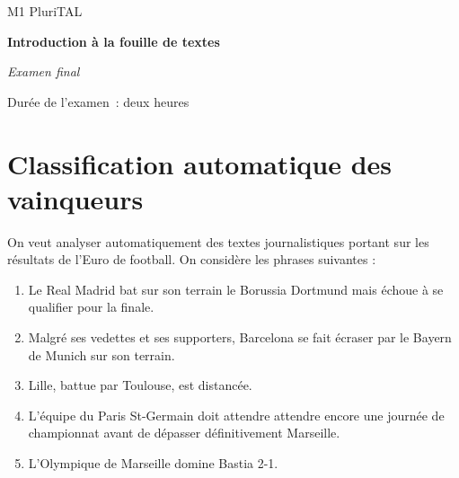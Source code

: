 \documentclass[a4paper, 11pt]{article}
\title{\titlepagetitle}
\author{\myname <\mymail>}
\date{\docdate}
\begin{document}
{
   \begin{center}
      \large{M1 PluriTAL}\par
      \vspace{1em}
      \huge\textbf{Introduction à la fouille de textes}\par
      \vspace{0.5em}
      \LARGE\textit{Examen final}\par
      \vspace{0.5em}
      \Large\thedate
   \end{center}
}

Durée de l'examen : deux heures


\section{Classification automatique des vainqueurs}
On veut analyser automatiquement des textes journalistiques portant
sur les résultats de l'Euro de football. On considère les phrases suivantes :

\begin{enumerate}[label=\alph*.]
    \item Le Real Madrid bat sur son terrain le Borussia Dortmund mais échoue à se qualifier pour la finale.
    \item Malgré ses vedettes et ses supporters, Barcelona se fait  écraser par le Bayern de Munich sur son terrain.
    \item Lille, battue par Toulouse, est distancée.
    \item L'équipe du Paris St-Germain doit attendre attendre encore une journée de championnat avant de dépasser définitivement Marseille.
    \item L'Olympique de Marseille domine Bastia 2-1.
\end{enumerate}
\end{document}
